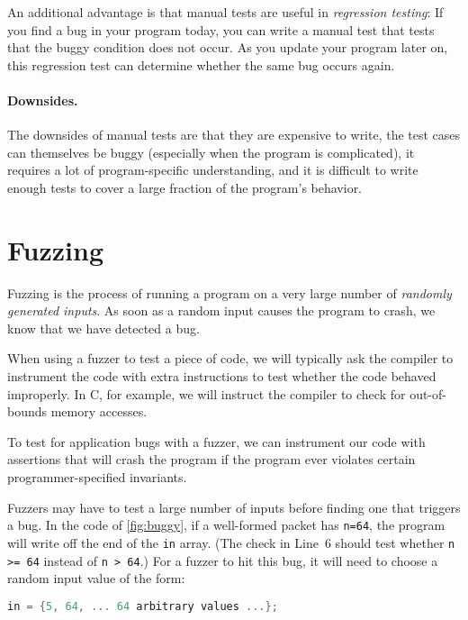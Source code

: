 An additional advantage is that manual tests are useful in \emph{regression testing}:
If you find a bug in your program today, you can write a manual test that
tests that the buggy condition does not occur. As you update your program 
later on, this regression test can determine whether the same bug occurs again.

\paragraph{Downsides.}
The downsides of manual tests are that they are expensive to write, 
the test cases can themselves be buggy (especially when the program is complicated),
it requires a lot of program-specific understanding, 
and it is difficult to write enough tests to cover a large fraction of the
program's behavior.

\section{Fuzzing}

Fuzzing is the process of running a program on a very large
number of \emph{randomly generated inputs}.
As soon as a random input causes the program to crash, we
know that we have detected a bug.

When using a fuzzer to test a piece of code, we will typically
ask the compiler to instrument the code with extra instructions
to test whether the code behaved improperly.
In C, for example, we will instruct the compiler to check
for out-of-bounds memory accesses.

To test for application bugs with a fuzzer, we can instrument our
code with assertions that will crash the program if the program 
ever violates certain programmer-specified invariants.

Fuzzers may have to test a large number of inputs before finding
one that triggers a bug.
In the code of \cref{fig:buggy}, if a well-formed packet has \texttt{n=64},
the program will write off the end of the \texttt{in} array.
(The check in Line~6 should test whether \texttt{n >= 64} instead of \texttt{n > 64}.)
For a fuzzer to hit this bug, it will need to choose a random input
value of the form:
\begin{lstlisting}[language=c]
in = {5, 64, ... 64 arbitrary values ...};
\end{lstlisting}

